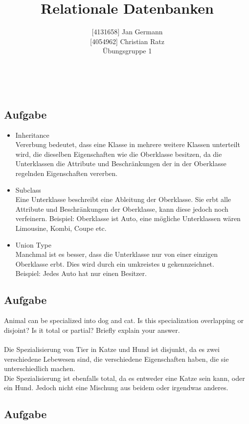 \documentclass[11pt,a4paper,DIV=9]{scrartcl}
\author{{[}4131658{]} Jan Germann \\{[}4054962{]} Christian Ratz\\Übungsgruppe 1}
\title{Relationale Datenbanken}
\newcounter{temp}
\newcommand{\aufgabe}[1]{
  \setcounter{temp}{\value{subsection}}
  \setcounter{subsection}{#1}
  \addtocounter{subsection}{-1}
  \subsection{Aufgabe}
  \setcounter{subsection}{\value{temp}}
}
\renewcommand{\author}[1]{\renewcommand{\author}{#1}}
\renewcommand{\title}[1]{\renewcommand{\title}{#1}}
\newcommand{\makehomeworktitle}{
  \begin{minipage}[t]{6.5cm}
    \sf{\author}
  \end{minipage}
  \begin{minipage}[t]{6.5cm}
    \begin{flushright}
      \sf{\title\\\today}
    \end{flushright}
  \end{minipage}
  \\[0.2cm]
  \begin{center}
    \sf{
      \color{blue}{
        \LARGE{Aufgabenblatt \blattnr}
      }
    }
  \end{center}
  \vspace{0.1cm}
}
\begin{document}
\makehomeworktitle

\aufgabe{1}
\begin{itemize}
 \item Inheritance
 \\ Vererbung bedeutet, dass eine Klasse in mehrere weitere Klassen unterteilt wird, die dieselben Eigenschaften wie die Oberklasse besitzen, da die Unterklassen die Attribute und Beschr\"ankungen der in der Oberklasse regelnden Eigenschaften vererben. \\
 \item Subclass
 \\ Eine Unterklasse beschreibt eine Ableitung der Oberklasse. Sie erbt alle Attribute und Beschr\"ankungen der Oberklasse, kann diese jedoch noch verfeinern. Beispiel: Oberklasse ist Auto, eine m\"ogliche Unterklassen w\"aren Limousine, Kombi, Coupe etc. \\
 \item Union Type
 \\Manchmal ist es besser, dass die Unterklasse nur von einer einzigen Oberklasse erbt. Dies wird durch ein umkreistes \texttt{u} gekennzeichnet. \\Beispiel: Jedes Auto hat nur einen Besitzer.
\end{itemize}
\aufgabe{2}
Animal can be specialized into dog and cat. Is this specialization overlapping or disjoint? Is it total or partial? Briefly explain your answer. \\
\\ Die Spezialisierung von Tier in Katze und Hund ist disjunkt, da es zwei verschiedene Lebewesen sind, die verschiedene Eigenschaften haben, die sie unterschiedlich machen.
\\ Die Spezialisierung ist ebenfalls total, da es entweder eine Katze sein kann, oder ein Hund. Jedoch nicht eine Mischung aus beidem oder irgendwas anderes.
\aufgabe{3}
\end{document}
